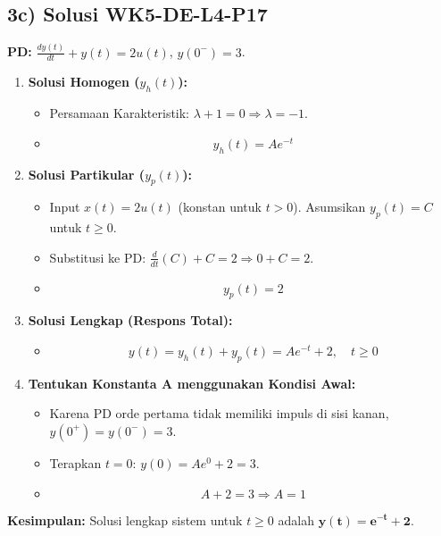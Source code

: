 \documentclass[
  letterpaper,
  DIV=11,
  numbers=noendperiod]{scrreprt}
\providecommand{\tightlist}{%
  \setlength{\itemsep}{0pt}\setlength{\parskip}{0pt}}
\begin{document}
\subsection{3c) Solusi WK5-DE-L4-P17}\label{c-solusi-wk5-de-l4-p17}

\textbf{PD:} \(\frac{dy(t)}{dt} + y(t) = 2u(t)\), \(y(0^-) = 3\).

\begin{enumerate}
\def\labelenumi{\arabic{enumi}.}
\tightlist
\item
  \textbf{Solusi Homogen (\(y_h(t)\)):}

  \begin{itemize}
  \tightlist
  \item
    Persamaan Karakteristik:
    \(\lambda + 1 = 0 \Rightarrow \lambda = -1\).
  \item
    \[y_h(t) = A e^{-t}\]
  \end{itemize}
\item
  \textbf{Solusi Partikular (\(y_p(t)\)):}

  \begin{itemize}
  \tightlist
  \item
    Input \(x(t) = 2u(t)\) (konstan untuk \(t>0\)). Asumsikan
    \(y_p(t) = C\) untuk \(t \ge 0\).
  \item
    Substitusi ke PD: \(\frac{d}{dt}(C) + C = 2 \Rightarrow 0 + C = 2\).
  \item
    \[y_p(t) = 2\]
  \end{itemize}
\item
  \textbf{Solusi Lengkap (Respons Total):}

  \begin{itemize}
  \tightlist
  \item
    \[y(t) = y_h(t) + y_p(t) = A e^{-t} + 2, \quad t \ge 0\]
  \end{itemize}
\item
  \textbf{Tentukan Konstanta A menggunakan Kondisi Awal:}

  \begin{itemize}
  \tightlist
  \item
    Karena PD orde pertama tidak memiliki impuls di sisi kanan,
    \(y(0^+) = y(0^-) = 3\).
  \item
    Terapkan \(t=0\): \(y(0) = A e^0 + 2 = 3\).
  \item
    \[A + 2 = 3 \Rightarrow A = 1\]
  \end{itemize}
\end{enumerate}

\textbf{Kesimpulan:} Solusi lengkap sistem untuk \(t \ge 0\) adalah
\(\mathbf{y(t) = e^{-t} + 2}\).
\end{document}
